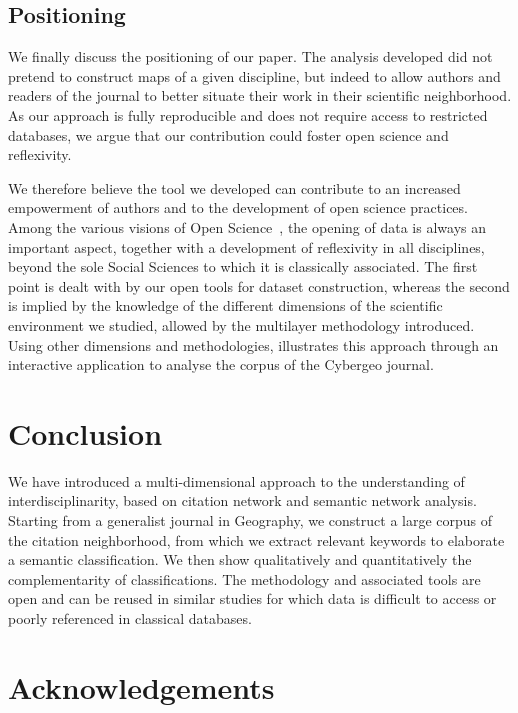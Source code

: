 \documentclass[10pt]{article}
\begin{document}
\subsection*{Positioning}

We finally discuss the positioning of our paper. The analysis developed did not pretend to construct maps of a given discipline, but indeed to allow authors and readers of the journal to better situate their work in their scientific neighborhood. As our approach is fully reproducible and does not require access to restricted databases, we argue that our contribution could foster open science and reflexivity.

We therefore believe the tool we developed can contribute to an increased empowerment of authors and to the development of open science practices. Among the various visions of Open Science~\citep{fecher2014open}, the opening of data is always an important aspect, together with a development of reflexivity in all disciplines, beyond the sole Social Sciences to which it is classically associated. The first point is dealt with by our open tools for dataset construction, whereas the second is implied by the  knowledge of the different dimensions of the scientific environment we studied, allowed by the multilayer methodology introduced. Using other dimensions and methodologies, \cite{banos2018spatialised} illustrates this approach through an interactive application to analyse the corpus of the Cybergeo journal.





\section*{Conclusion}
\label{sec:discussion}


We have introduced a multi-dimensional approach to the understanding of interdisciplinarity, based on citation network and semantic network analysis. Starting from a generalist journal in Geography, we construct a large corpus of the citation neighborhood, from which we extract relevant keywords to elaborate a semantic classification. We then show qualitatively and quantitatively the complementarity of classifications. The methodology and associated tools are open and can be reused in similar studies for which data is difficult to access or poorly referenced in classical databases.




\section*{Acknowledgements}
\end{document}
